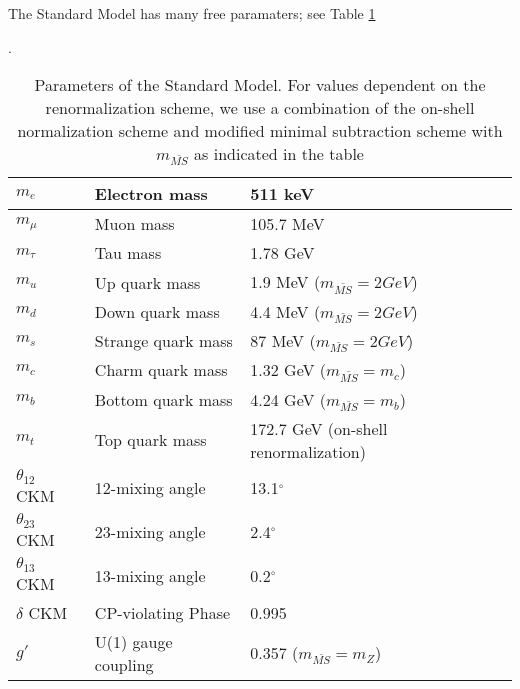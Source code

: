 The Standard Model has many free paramaters; see Table \ref{tab:sm_free_parameters}
\begin{table}
\centering
\caption{Parameters of the Standard Model.  For values dependent on the renormalization scheme, we use a combination of the on-shell normalization scheme \cite{Hollik:1988ii, Bardin:1989vz, Kennedy:1988rt, Sirlin:1980nh} and  modified minimal subtraction scheme with $m_{\bar{MS}}$ as indicated in the table\cite{ Fanchiotti:1992tu}}.
\label{tab:sm_free_parameters}
\begin{tabular}{| l | l | l |}
\hline
$m_e$             & Electron mass                  & 511 keV                           \\ \hline
$m_\mu$           & Muon mass                      & 105.7 MeV                         \\ \hline
$m_\tau$          & Tau mass                       & 1.78 GeV                          \\ \hline
$m_u$             & Up quark mass                  & 1.9 MeV   ($m_{\bar{MS}} = 2 GeV$)                        \\ \hline
$m_d$             & Down quark mass                & 4.4 MeV   ($m_{\bar{MS}} = 2 GeV$)                       \\ \hline
$m_s$             & Strange quark mass             & 87 MeV    ($m_{\bar{MS}} = 2 GeV$)                        \\ \hline
$m_c$             & Charm quark mass               & 1.32 GeV  ($m_{\bar{MS}} = m_c$)                        \\ \hline
$m_b$             & Bottom quark mass              & 4.24 GeV  ($m_{\bar{MS}} = m_b$)  \\ \hline
$m_t$             & Top quark mass                 & 172.7 GeV (on-shell renormalization)                       \\ \hline
$\theta_{12}$ CKM & 12-mixing angle                & 13.1$^{\circ}$                    \\ \hline
$\theta_{23}$ CKM & 23-mixing angle                & 2.4$^{\circ}$                     \\ \hline
$\theta_{13}$ CKM & 13-mixing angle                & 0.2$^{\circ}$                     \\ \hline
$\delta$ CKM      & CP-violating Phase             & 0.995                             \\ \hline
$g'$              & U(1) gauge coupling            & 0.357     ($m_{\bar{MS}} = m_Z$)                         \\ \hline

\end{tabular}
\end{table}
